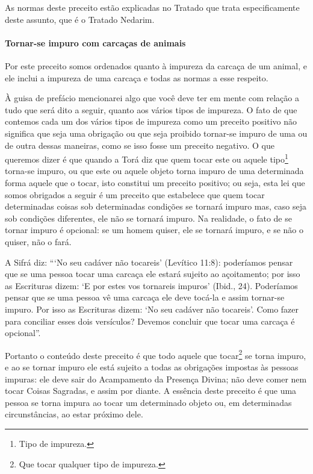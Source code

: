 As normas deste preceito estão explicadas no Tratado que trata
especificamente deste assunto, que é o Tratado Nedarim.

\paragraph{Tornar-se impuro com carcaças de animais}

Por este preceito somos ordenados quanto à impureza da carcaça de um
animal, e ele inclui a impureza de uma carcaça e todas as normas a esse
respeito.

À guisa de prefácio mencionarei algo que você deve ter em mente com
relação a tudo que será dito a seguir, quanto aos vários tipos de
impureza. O fato de que contemos cada um dos vários tipos de impureza
como um preceito positivo não significa que seja uma obrigação ou que
seja proibido tornar-se impuro de uma ou de outra dessas maneiras, como
se isso fosse um preceito negativo. O que queremos dizer é que quando a
Torá diz que quem tocar este ou aquele tipo\footnote{Tipo de impureza.}
torna-se impuro, ou que este ou aquele objeto torna impuro de uma
determinada forma aquele que o tocar, isto constitui um preceito
positivo; ou seja, esta lei que somos obrigados a seguir é um preceito
que estabelece que quem tocar determinadas coisas sob determinadas
condições se tornará impuro mas, caso seja sob condições diferentes, ele
não se tornará impuro. Na realidade, o fato de se tornar impuro é
opcional: se um homem quiser, ele se tornará impuro, e se não o quiser,
não o fará.

A Sifrá diz: ```No seu cadáver não tocareis' (Levítico 11:8):
poderíamos pensar que se uma pessoa tocar uma carcaça ele estará
sujeito ao açoitamento; por isso as Escrituras dizem: `E por estes vos
tornareis impuros' (Ibid., 24). Poderíamos pensar que se uma pessoa vê
uma carcaça ele deve tocá-la e assim tornar-se impuro. Por isso as
Escrituras dizem: `No seu cadáver não tocareis'. Como fazer para
conciliar esses dois versículos? Devemos concluir que tocar uma carcaça
é opcional''.


Portanto o conteúdo deste preceito é que todo aquele que
tocar\footnote{Que tocar qualquer tipo de impureza.} se torna impuro, e ao se tornar impuro ele
está sujeito a todas as obrigações impostas às pessoas impuras: ele deve
sair do Acampamento da Presença Divina; não deve comer nem tocar Coisas
Sagradas, e assim por diante. A essência deste preceito é que uma pessoa
se torna impura ao tocar um determinado objeto ou, em determinadas
circunstâncias, ao estar próximo dele.

